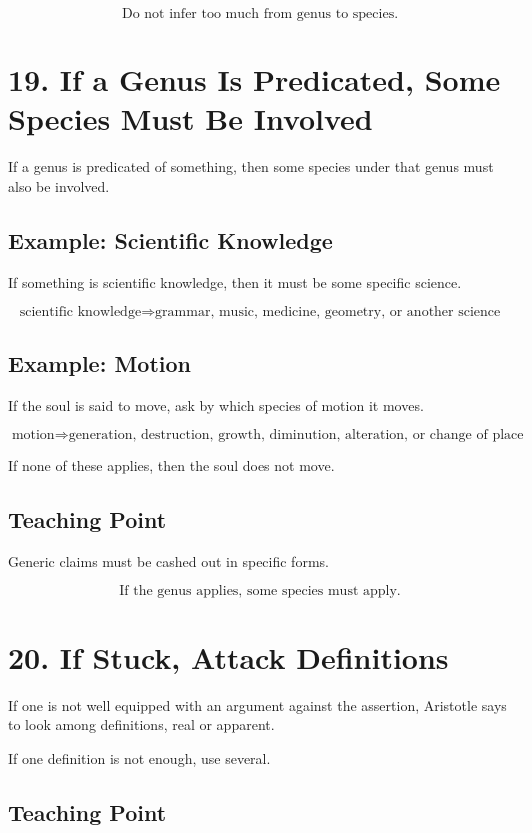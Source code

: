 \documentclass[12pt]{article}
\begin{document}
\[
\boxed{
\text{Do not infer too much from genus to species.}
}
\]

\section*{19. If a Genus Is Predicated, Some Species Must Be Involved}

If a genus is predicated of something, then some species under that genus must
also be involved.

\subsection*{Example: Scientific Knowledge}

If something is scientific knowledge, then it must be some specific science.

\[
\text{scientific knowledge}
\Rightarrow
\text{grammar, music, medicine, geometry, or another science}
\]

\subsection*{Example: Motion}

If the soul is said to move, ask by which species of motion it moves.

\[
\text{motion}
\Rightarrow
\text{generation, destruction, growth, diminution, alteration, or change of place}
\]

If none of these applies, then the soul does not move.

\subsection*{Teaching Point}

Generic claims must be cashed out in specific forms.

\[
\boxed{
\text{If the genus applies, some species must apply.}
}
\]

\section*{20. If Stuck, Attack Definitions}

If one is not well equipped with an argument against the assertion, Aristotle
says to look among definitions, real or apparent.

If one definition is not enough, use several.

\subsection*{Teaching Point}
\end{document}
